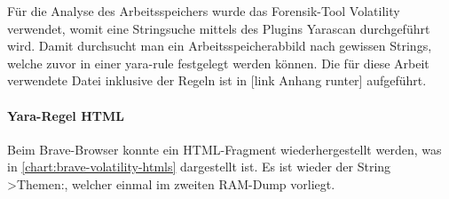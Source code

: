Für die Analyse des Arbeitsspeichers wurde das Forensik-Tool Volatility verwendet, womit eine Stringsuche mittels des Plugins Yarascan durchgeführt wird. Damit durchsucht man ein Arbeitsspeicherabbild nach gewissen Strings, welche zuvor in einer yara-rule festgelegt werden können. Die für diese Arbeit verwendete Datei inklusive der Regeln ist in [link Anhang runter] aufgeführt. 

\paragraph*{Yara-Regel \glqq{}HTML\grqq{}}\label{chap:ergebnisse-brave-uncommon-locations-volatility-html}

Beim Brave-Browser konnte ein HTML-Fragment wiederhergestellt werden, was in \autoref{chart:brave-volatility-htmls} dargestellt ist. Es ist wieder der String \glqq{}>Themen:\grqq, welcher einmal im zweiten RAM-Dump vorliegt.

